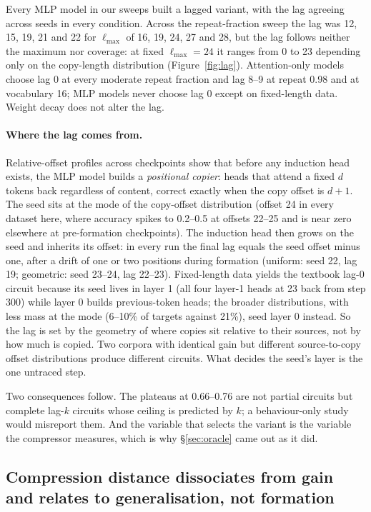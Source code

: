 \documentclass[11pt]{article}
\begin{document}
Every MLP model in our sweeps built a lagged variant, with the lag agreeing
across seeds in every condition. Across the repeat-fraction sweep the lag
was 12, 15, 19, 21 and 22 for $\ell_{\max}$ of 16, 19, 24, 27 and 28, but
the lag follows neither the maximum nor coverage: at fixed
$\ell_{\max}=24$ it ranges from 0 to 23 depending only on the copy-length
distribution (Figure~\ref{fig:lag}). Attention-only models choose lag 0 at
every moderate repeat fraction and lag 8--9 at repeat 0.98 and at
vocabulary 16; MLP models never choose lag 0 except on fixed-length data.
Weight decay does not alter the lag.

\paragraph{Where the lag comes from.}
Relative-offset profiles across checkpoints show that before any induction
head exists, the MLP model builds a \emph{positional copier}: heads that
attend a fixed $d$ tokens back regardless of content, correct exactly when
the copy offset is $d+1$. The seed sits at the mode of the copy-offset
distribution (offset 24 in every dataset here, where accuracy spikes to
0.2--0.5 at offsets 22--25 and is near zero elsewhere at pre-formation
checkpoints). The induction head then grows on the seed and inherits its
offset: in every run the final lag equals the seed offset minus one, after
a drift of one or two positions during formation (uniform: seed 22, lag 19;
geometric: seed 23--24, lag 22--23). Fixed-length data yields the textbook
lag-0 circuit because its seed lives in layer 1 (all four layer-1 heads at
23 back from step 300) while layer 0 builds previous-token heads; the
broader distributions, with less mass at the mode (6--10\% of targets
against 21\%), seed layer 0 instead. So the lag is set by the geometry of
where copies sit relative to their sources, not by how much is copied. Two
corpora with identical gain but different source-to-copy offset
distributions produce different circuits. What decides the seed's layer is
the one untraced step.

Two consequences follow. The plateaus at 0.66--0.76 are not partial
circuits but complete lag-$k$ circuits whose ceiling is predicted by $k$; a
behaviour-only study would misreport them. And the variable that selects
the variant is the variable the compressor measures, which is why
\S\ref{sec:oracle} came out as it did.

\subsection{Compression distance dissociates from gain and relates to
generalisation, not formation}
\label{sec:diversity}
\end{document}
